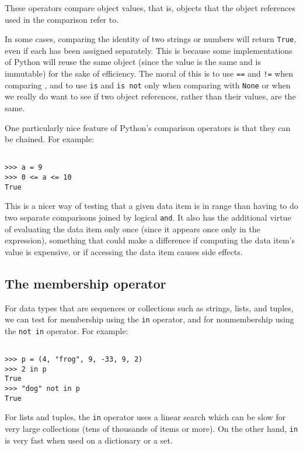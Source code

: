 These operators compare object values, that is, objects that the object references used in the comparison refer to.


In some cases, comparing the identity of two strings or numbers will return \verb|True|, even if each has been assigned separately.
This is because some implementations of Python will reuse the same object (since the value is the same and is immutable) for the sake of efficiency.
The moral of this is to use \verb|==| and \verb|!=| when comparing , and to use \verb|is| and \verb|is not| only when comparing with \verb|None| or when we really do want to see if two object references, rather than their values, are the same.



One particularly nice feature of Python’s comparison operators is that they can be chained.
For example:
\begin{lstlisting}

>>> a = 9
>>> 0 <= a <= 10
True
\end{lstlisting}



This is a nicer way of testing that a given data item is in range than having to do two separate comparisons joined by logical \verb|and|.
It also has the additional virtue of evaluating the data item only once (since it appears once only in the expression), something that could make a difference if computing the data item's value is expensive, or if accessing the data item causes side effects.


\subsection{The membership operator}

For data types that are sequences or collections such as strings, lists, and tuples, we can test for membership using the \verb|in| operator, and for nonmembership using the \verb|not in| operator. For example:
\begin{lstlisting}

>>> p = (4, "frog", 9, -33, 9, 2)
>>> 2 in p
True
>>> "dog" not in p
True
\end{lstlisting}



For lists and tuples, the \verb|in| operator uses a linear search which can be slow for very large collections (tens of thousands of items or more).
On the other hand, \verb|in| is very fast when used on a dictionary or a set.



